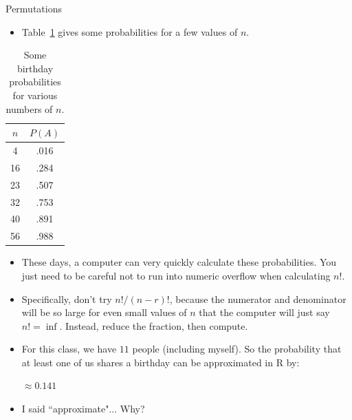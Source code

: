 \begin{frame}[allowframebreaks]{Permutations}
  \framebreak
  
  \begin{itemize}
    \item Table~\ref{tab:birthdays} gives some probabilities for a few values of $n$. 
  \end{itemize}
  
      \begin{table}
    \centering
    \begin{tabular}{cc}
      $n$ & $P(A)$ \\\hline
      4 & .016 \\
      16 & .284 \\
      23 & .507 \\
      32 & .753 \\
      40 & .891 \\
      56 & .988 \\\hline
    \end{tabular}
    \caption{\label{tab:birthdays}Some birthday probabilities for various numbers of $n$.}
    \end{table}
  
  \framebreak
  
  \begin{itemize}
    \item These days, a computer can very quickly calculate these probabilities. You just need to be careful not to run into numeric overflow when calculating $n!$.
    \item Specifically, don't try $n! / (n - r)!$, because the numerator and denominator will be so large for even small values of $n$ that the computer will just say $n! = \inf$. Instead, reduce the fraction, then compute.
    \item For this class, we have $11$ people (including myself). So the probability that at least one of us shares a birthday can be approximated in R by: 
      \begin{center}
         $\approx 0.141$
      \end{center}
    \item I said ``approximate"... Why?
  \end{itemize}
  
  \framebreak
  
\end{frame}

